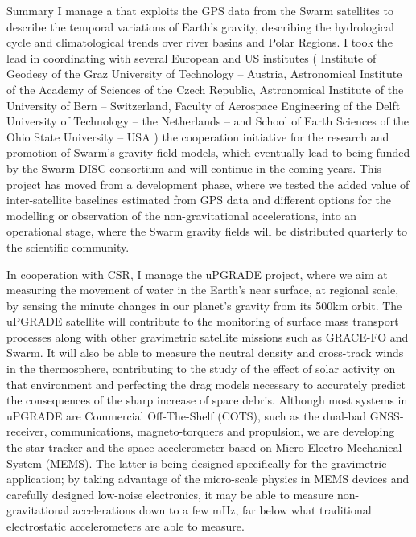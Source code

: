 \begin{cvtext}{Summary}
I manage a  that exploits the \ac{GPS} data from the Swarm satellites to describe the temporal variations of Earth's gravity, describing the hydrological cycle and climatological trends over river basins and Polar Regions.
I took the lead in coordinating with several European and US institutes (%
Institute of Geodesy of the Graz University of Technology -- Austria,
Astronomical Institute of the Academy of Sciences of the Czech Republic,
Astronomical Institute of the University of Bern -- Switzerland,
Faculty of Aerospace Engineering of the Delft University of Technology -- the Netherlands -- and
School of Earth Sciences of the Ohio State University -- USA%
) the cooperation initiative for the research and promotion of Swarm's gravity field models, which eventually lead to being funded by the Swarm \ac{DISC} consortium and will continue in the coming years.
This project has moved from a development phase, where we tested the added value of inter-satellite baselines estimated from GPS data and different options for the modelling or observation of the non-gravitational accelerations, into an operational stage, where the Swarm gravity fields will be distributed quarterly to the scientific community.

In cooperation with \ac{CSR}, I manage the uPGRADE project, where we aim at measuring the movement of water in the Earth’s near surface, at regional scale, by sensing the minute changes in our planet’s gravity from its 500km orbit.
The uPGRADE satellite will contribute to the monitoring of surface mass transport processes along with other gravimetric satellite missions such as GRACE-FO and Swarm.
It will also be able to measure the neutral density and cross-track winds in the thermosphere, contributing to the study of the effect of solar activity on that environment and perfecting the drag models necessary to accurately predict the consequences of the sharp increase of space debris.
Although most systems in uPGRADE are Commercial Off-The-Shelf (COTS), such as the dual-bad GNSS-receiver, communications, magneto-torquers and propulsion, we are developing the star-tracker and the space accelerometer based on Micro Electro-Mechanical System (MEMS).
The latter is being designed specifically for the gravimetric application; by taking advantage of the micro-scale physics in MEMS devices and carefully designed low-noise electronics, it may be able to measure non-gravitational accelerations down to a few mHz, far below what traditional electrostatic accelerometers are able to measure.


\end{cvtext}
